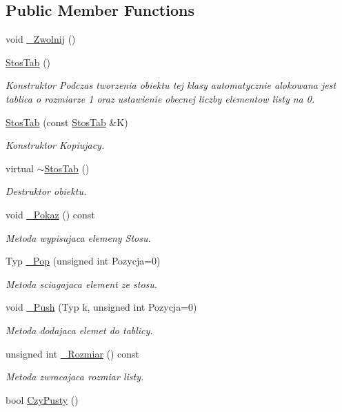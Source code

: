 \subsection*{Public Member Functions}
\begin{DoxyCompactItemize}
\item 
void \hyperlink{class_stos_tab_aec0cb259c6f044fa7d3b367dc1baca5c}{\-\_\-\-Zwolnij} ()
\item 
\hyperlink{class_stos_tab_a347bc350ea6ff8ad86b853895db5e7a9}{Stos\-Tab} ()
\begin{DoxyCompactList}\small\item\em Konstruktor Podczas tworzenia obiektu tej klasy automatycznie alokowana jest tablica o rozmiarze 1 oraz ustawienie obecnej liczby elementow listy na 0. \end{DoxyCompactList}\item 
\hyperlink{class_stos_tab_a5972345c1b71597d11330f8953dec03d}{Stos\-Tab} (const \hyperlink{class_stos_tab}{Stos\-Tab} \&K)
\begin{DoxyCompactList}\small\item\em Konstruktor Kopiujacy. \end{DoxyCompactList}\item 
virtual \hyperlink{class_stos_tab_a580b0a918a829377698f475a5f75457b}{$\sim$\-Stos\-Tab} ()
\begin{DoxyCompactList}\small\item\em Destruktor obiektu. \end{DoxyCompactList}\item 
void \hyperlink{class_stos_tab_a1b3c30902f28bf819ea5864c85ebede9}{\-\_\-\-Pokaz} () const 
\begin{DoxyCompactList}\small\item\em Metoda wypisujaca elemeny Stosu. \end{DoxyCompactList}\item 
Typ \hyperlink{class_stos_tab_a43e5e031570e69dc27fc11feca969645}{\-\_\-\-Pop} (unsigned int Pozycja=0)
\begin{DoxyCompactList}\small\item\em Metoda sciagajaca element ze stosu. \end{DoxyCompactList}\item 
void \hyperlink{class_stos_tab_a73c95fc8151510c21c5567e85296ea31}{\-\_\-\-Push} (Typ k, unsigned int Pozycja=0)
\begin{DoxyCompactList}\small\item\em Metoda dodajaca elemet do tablicy. \end{DoxyCompactList}\item 
unsigned int \hyperlink{class_stos_tab_a51b2da61d6c4c2085646b84395c2d3c0}{\-\_\-\-Rozmiar} () const 
\begin{DoxyCompactList}\small\item\em Metoda zwracajaca rozmiar listy. \end{DoxyCompactList}\item 
bool \hyperlink{class_stos_tab_af75e71d75e10fcce0b2751c84728b38c}{Czy\-Pusty} ()
\end{DoxyCompactItemize}
